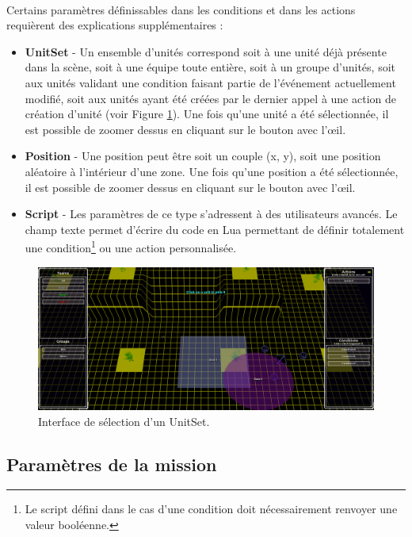 \documentclass[a4paper]{article}
\begin{document}
\paragraph{ }
Certains paramètres définissables dans les conditions et dans les actions requièrent des explications supplémentaires :
\begin{itemize}
\item \textbf{UnitSet} - Un ensemble d'unités correspond soit à une unité déjà présente dans la scène, soit à une équipe toute entière, soit à un groupe d'unités, soit aux unités validant une condition faisant partie de l'événement actuellement modifié, soit aux unités ayant été créées par le dernier appel à une action de création d'unité (voir Figure \ref{fig:editor-pickunit}). Une fois qu'une unité a été sélectionnée, il est possible de zoomer dessus en cliquant sur le bouton avec l'œil.
\item \textbf{Position} - Une position peut être soit un couple (x, y), soit une position aléatoire à l'intérieur d'une zone. Une fois qu'une position a été sélectionnée, il est possible de zoomer dessus en cliquant sur le bouton avec l'œil.
\item \textbf{Script} - Les paramètres de ce type s'adressent à des utilisateurs avancés. Le champ texte permet d'écrire du code en Lua permettant de définir totalement une condition\footnote{Le script défini dans le cas d'une condition doit nécessairement renvoyer une valeur booléenne.} ou une action personnalisée.
\end{itemize}
\begin{figure}[H]
\centering
\includegraphics[width=\linewidth]{editor-pickunit.png}
\caption{Interface de sélection d'un UnitSet.}
\label{fig:editor-pickunit}
\end{figure}
\subsection{Paramètres de la mission}\label{mapsettings}
\end{document}

